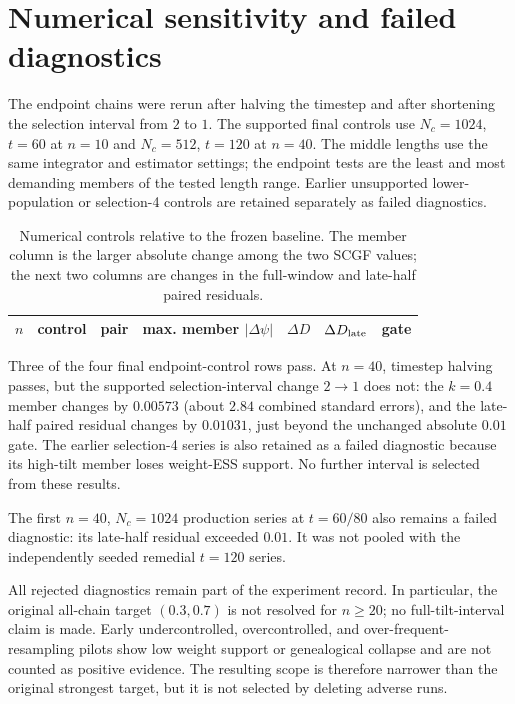 \documentclass[11pt]{article}
\begin{document}
\section{Numerical sensitivity and failed diagnostics}

The endpoint chains were rerun after halving the timestep and after shortening
the selection interval from $2$ to $1$.  The supported final controls use
$N_c=1024$, $t=60$ at $n=10$ and $N_c=512$, $t=120$ at $n=40$.  The middle
lengths use the same integrator and estimator settings; the endpoint tests are
the least and most demanding members of the tested length range.  Earlier
unsupported lower-population or selection-4 controls are retained separately
as failed diagnostics.

\begin{table}[ht]
\centering
\small
\caption{Numerical controls relative to the frozen baseline.  The member
column is the larger absolute change among the two SCGF values; the next two
columns are changes in the full-window and late-half paired residuals.}
\label{tab:controls}
\begin{tabular}{rllrrrl}
\toprule
$n$ & control & pair & max. member $|\Delta\psi|$ & $\Delta D$ &
$\Delta D_{\rm late}$ & gate \\
\midrule

\end{tabular}
\end{table}

Three of the four final endpoint-control rows pass.  At $n=40$, timestep
halving passes, but the supported selection-interval change $2\to1$ does not:
the $k=0.4$ member changes by $0.00573$ (about $2.84$ combined standard
errors), and the late-half paired residual changes by $0.01031$, just beyond
the unchanged absolute $0.01$ gate.  The earlier selection-4 series is also
retained as a failed diagnostic because its high-tilt member loses weight-ESS
support.  No further interval is selected from these results.

The first $n=40$, $N_c=1024$ production series at $t=60/80$ also remains a
failed diagnostic: its late-half residual exceeded $0.01$.  It was not pooled
with the independently seeded remedial $t=120$ series.

All rejected diagnostics remain part of the experiment record.  In
particular, the original all-chain target $(0.3,0.7)$ is not resolved for
$n\ge20$; no full-tilt-interval claim is made.  Early undercontrolled,
overcontrolled, and over-frequent-resampling pilots show low weight support or
genealogical collapse and are not counted as positive evidence.  The resulting
scope is therefore narrower than the original strongest target, but it is not
selected by deleting adverse runs.
\end{document}
